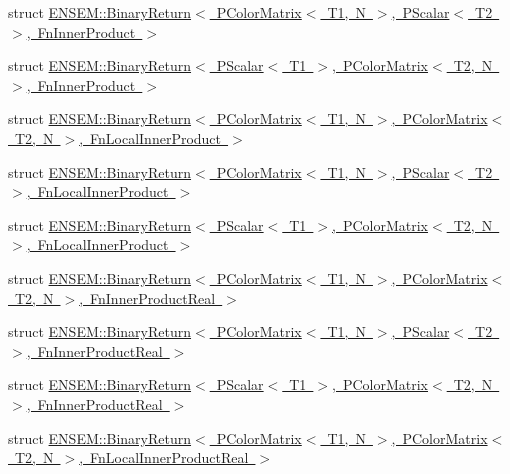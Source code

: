 \begin{DoxyCompactItemize}
\item 
struct \mbox{\hyperlink{structENSEM_1_1BinaryReturn_3_01PColorMatrix_3_01T1_00_01N_01_4_00_01PScalar_3_01T2_01_4_00_01FnInnerProduct_01_4}{E\+N\+S\+E\+M\+::\+Binary\+Return$<$ P\+Color\+Matrix$<$ T1, N $>$, P\+Scalar$<$ T2 $>$, Fn\+Inner\+Product $>$}}
\item 
struct \mbox{\hyperlink{structENSEM_1_1BinaryReturn_3_01PScalar_3_01T1_01_4_00_01PColorMatrix_3_01T2_00_01N_01_4_00_01FnInnerProduct_01_4}{E\+N\+S\+E\+M\+::\+Binary\+Return$<$ P\+Scalar$<$ T1 $>$, P\+Color\+Matrix$<$ T2, N $>$, Fn\+Inner\+Product $>$}}
\item 
struct \mbox{\hyperlink{structENSEM_1_1BinaryReturn_3_01PColorMatrix_3_01T1_00_01N_01_4_00_01PColorMatrix_3_01T2_00_01N_8f6cd73d0788242d6be21a14b362f366}{E\+N\+S\+E\+M\+::\+Binary\+Return$<$ P\+Color\+Matrix$<$ T1, N $>$, P\+Color\+Matrix$<$ T2, N $>$, Fn\+Local\+Inner\+Product $>$}}
\item 
struct \mbox{\hyperlink{structENSEM_1_1BinaryReturn_3_01PColorMatrix_3_01T1_00_01N_01_4_00_01PScalar_3_01T2_01_4_00_01FnLocalInnerProduct_01_4}{E\+N\+S\+E\+M\+::\+Binary\+Return$<$ P\+Color\+Matrix$<$ T1, N $>$, P\+Scalar$<$ T2 $>$, Fn\+Local\+Inner\+Product $>$}}
\item 
struct \mbox{\hyperlink{structENSEM_1_1BinaryReturn_3_01PScalar_3_01T1_01_4_00_01PColorMatrix_3_01T2_00_01N_01_4_00_01FnLocalInnerProduct_01_4}{E\+N\+S\+E\+M\+::\+Binary\+Return$<$ P\+Scalar$<$ T1 $>$, P\+Color\+Matrix$<$ T2, N $>$, Fn\+Local\+Inner\+Product $>$}}
\item 
struct \mbox{\hyperlink{structENSEM_1_1BinaryReturn_3_01PColorMatrix_3_01T1_00_01N_01_4_00_01PColorMatrix_3_01T2_00_01N_a4676c92a67ac76680eb238b39ddbac2}{E\+N\+S\+E\+M\+::\+Binary\+Return$<$ P\+Color\+Matrix$<$ T1, N $>$, P\+Color\+Matrix$<$ T2, N $>$, Fn\+Inner\+Product\+Real $>$}}
\item 
struct \mbox{\hyperlink{structENSEM_1_1BinaryReturn_3_01PColorMatrix_3_01T1_00_01N_01_4_00_01PScalar_3_01T2_01_4_00_01FnInnerProductReal_01_4}{E\+N\+S\+E\+M\+::\+Binary\+Return$<$ P\+Color\+Matrix$<$ T1, N $>$, P\+Scalar$<$ T2 $>$, Fn\+Inner\+Product\+Real $>$}}
\item 
struct \mbox{\hyperlink{structENSEM_1_1BinaryReturn_3_01PScalar_3_01T1_01_4_00_01PColorMatrix_3_01T2_00_01N_01_4_00_01FnInnerProductReal_01_4}{E\+N\+S\+E\+M\+::\+Binary\+Return$<$ P\+Scalar$<$ T1 $>$, P\+Color\+Matrix$<$ T2, N $>$, Fn\+Inner\+Product\+Real $>$}}
\item 
struct \mbox{\hyperlink{structENSEM_1_1BinaryReturn_3_01PColorMatrix_3_01T1_00_01N_01_4_00_01PColorMatrix_3_01T2_00_01N_e5866205f9ef728862be5918de5ab5d4}{E\+N\+S\+E\+M\+::\+Binary\+Return$<$ P\+Color\+Matrix$<$ T1, N $>$, P\+Color\+Matrix$<$ T2, N $>$, Fn\+Local\+Inner\+Product\+Real $>$}}

\end{DoxyCompactItemize}
